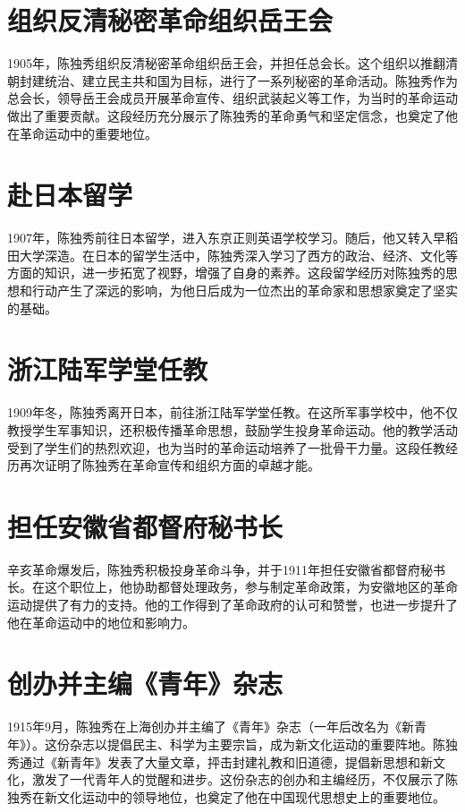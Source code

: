 \documentclass[10pt,a4paper]{beamer} %
\begin{document}
	\section{组织反清秘密革命组织岳王会}
	\begin{frame}
		1905年，陈独秀组织反清秘密革命组织岳王会，并担任总会长。这个组织以推翻清朝封建统治、建立民主共和国为目标，进行了一系列秘密的革命活动。陈独秀作为总会长，领导岳王会成员开展革命宣传、组织武装起义等工作，为当时的革命运动做出了重要贡献。这段经历充分展示了陈独秀的革命勇气和坚定信念，也奠定了他在革命运动中的重要地位。
	\end{frame}
	
	\section{赴日本留学}
	\begin{frame}
		1907年，陈独秀前往日本留学，进入东京正则英语学校学习。随后，他又转入早稻田大学深造。在日本的留学生活中，陈独秀深入学习了西方的政治、经济、文化等方面的知识，进一步拓宽了视野，增强了自身的素养。这段留学经历对陈独秀的思想和行动产生了深远的影响，为他日后成为一位杰出的革命家和思想家奠定了坚实的基础。
	\end{frame}
	
	\section{浙江陆军学堂任教}
	\begin{frame}
		1909年冬，陈独秀离开日本，前往浙江陆军学堂任教。在这所军事学校中，他不仅教授学生军事知识，还积极传播革命思想，鼓励学生投身革命运动。他的教学活动受到了学生们的热烈欢迎，也为当时的革命运动培养了一批骨干力量。这段任教经历再次证明了陈独秀在革命宣传和组织方面的卓越才能。
	\end{frame}
	
	\section{担任安徽省都督府秘书长}
	\begin{frame}
		辛亥革命爆发后，陈独秀积极投身革命斗争，并于1911年担任安徽省都督府秘书长。在这个职位上，他协助都督处理政务，参与制定革命政策，为安徽地区的革命运动提供了有力的支持。他的工作得到了革命政府的认可和赞誉，也进一步提升了他在革命运动中的地位和影响力。
	\end{frame}
	
	\section{创办并主编《青年》杂志}
	\begin{frame}
		1915年9月，陈独秀在上海创办并主编了《青年》杂志（一年后改名为《新青年》）。这份杂志以提倡民主、科学为主要宗旨，成为新文化运动的重要阵地。陈独秀通过《新青年》发表了大量文章，抨击封建礼教和旧道德，提倡新思想和新文化，激发了一代青年人的觉醒和进步。这份杂志的创办和主编经历，不仅展示了陈独秀在新文化运动中的领导地位，也奠定了他在中国现代思想史上的重要地位。
	\end{frame}
	
\end{document}
